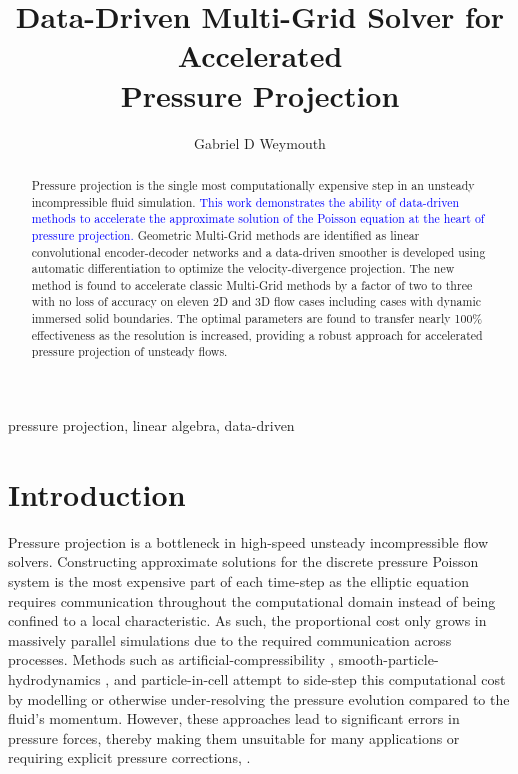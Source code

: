 \documentclass[review]{elsarticle}
\begin{document}
\begin{frontmatter}

\title{Data-Driven Multi-Grid Solver for Accelerated \\ Pressure Projection}

\author{Gabriel D Weymouth}
\address{Engineering and Physical Sciences, University of Southampton, Southampton, UK}
\address{Data-Centric Engineering, Alan Turing Institute, London, UK}

\begin{abstract}
Pressure projection is the single most computationally expensive step in an unsteady incompressible fluid simulation. \textcolor{blue}{This work demonstrates the ability of data-driven methods to accelerate the approximate solution of the Poisson equation at the heart of pressure projection.} Geometric Multi-Grid methods are identified as linear convolutional encoder-decoder networks and a data-driven smoother is developed using automatic differentiation to optimize the velocity-divergence projection. The new method is found to accelerate classic Multi-Grid methods by a factor of two to three with no loss of accuracy on eleven 2D and 3D flow cases including cases with dynamic immersed solid boundaries. The optimal parameters are found to transfer nearly 100\% effectiveness as the resolution is increased, providing a robust approach for accelerated pressure projection of unsteady flows.
\end{abstract}

\begin{keyword}
pressure projection, linear algebra, data-driven
\end{keyword}

\end{frontmatter}

\section{Introduction}

Pressure projection is a bottleneck in high-speed unsteady incompressible flow solvers. Constructing approximate solutions for the discrete pressure Poisson system is the most expensive part of each time-step as the elliptic equation requires communication throughout the computational domain instead of being confined to a local characteristic. As such, the proportional cost only grows in massively parallel simulations due to the required communication across processes. Methods such as artificial-compressibility \cite{he2002comparison}, smooth-particle-hydrodynamics \cite{kiara2013sph}, and particle-in-cell \cite{jiang2017angular} attempt to side-step this computational cost by modelling or otherwise under-resolving the pressure evolution compared to the fluid's momentum. However, these approaches lead to significant errors in pressure forces, thereby making them unsuitable for many applications or requiring explicit pressure corrections, \cite{kiara2013sph}.
\end{document}
